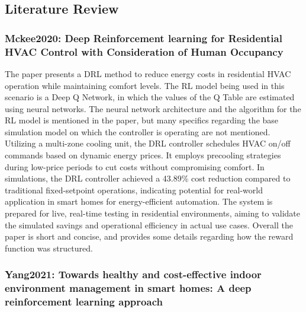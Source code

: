 \documentclass[
]{article}
\begin{document}
\hypertarget{literature-review}{%
\subsection{Literature Review}\label{literature-review}}

\hypertarget{mckee2020-deep-reinforcement-learning-for-residential-hvac-control-with-consideration-of-human-occupancy}{%
\subsubsection{Mckee2020: Deep Reinforcement learning for Residential
HVAC Control with Consideration of Human
Occupancy}\label{mckee2020-deep-reinforcement-learning-for-residential-hvac-control-with-consideration-of-human-occupancy}}

The paper presents a DRL method to reduce energy costs in residential
HVAC operation while maintaining comfort levels. The RL model being used
in this scenario is a Deep Q Network, in which the values of the Q Table
are estimated using neural networks. The neural network architecture and
the algorithm for the RL model is mentioned in the paper, but many
specifics regarding the base simulation model on which the controller is
operating are not mentioned. Utilizing a multi-zone cooling unit, the
DRL controller schedules HVAC on/off commands based on dynamic energy
prices. It employs precooling strategies during low-price periods to cut
costs without compromising comfort. In simulations, the DRL controller
achieved a 43.89\% cost reduction compared to traditional fixed-setpoint
operations, indicating potential for real-world application in smart
homes for energy-efficient automation. The system is prepared for live,
real-time testing in residential environments, aiming to validate the
simulated savings and operational efficiency in actual use cases.
Overall the paper is short and concise, and provides some details
regarding how the reward function was structured.

\hypertarget{yang2021-towards-healthy-and-cost-effective-indoor-environment-management-in-smart-homes-a-deep-reinforcement-learning-approach}{%
\subsubsection{Yang2021: Towards healthy and cost-effective indoor
environment management in smart homes: A deep reinforcement learning
approach}\label{yang2021-towards-healthy-and-cost-effective-indoor-environment-management-in-smart-homes-a-deep-reinforcement-learning-approach}}
\end{document}
